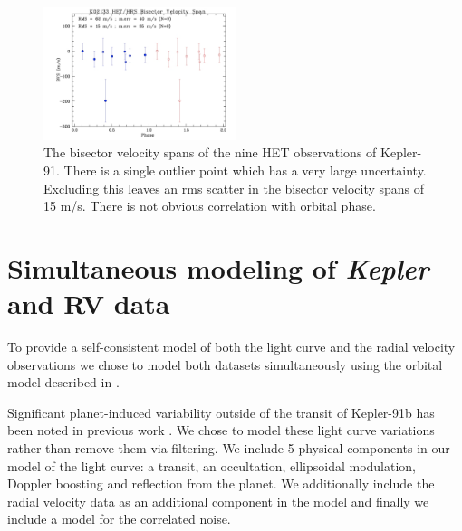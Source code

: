 \documentclass[apjl]{emulateapj}
\begin{document}

\begin{figure}
\includegraphics[width=0.50\textwidth]{k02133_bvs_phas1.pdf}
\caption{The bisector velocity spans of the nine HET observations of Kepler-91. There is a single outlier point which has a very large uncertainty. Excluding this leaves an rms scatter in the bisector velocity spans of 15 m/s. There is not obvious correlation with orbital phase.}
\label{fig:bisectors}
\end{figure}


\section{Simultaneous modeling of \emph{Kepler} and RV data}
To provide a self-consistent model of both the light curve and the radial velocity observations we chose to model both datasets simultaneously using the orbital model described in \citet{rowe14}.

Significant planet-induced variability outside of the transit of Kepler-91b has been noted in previous work \citep{lillo14,esteves13}. We chose to model these light curve variations rather than remove them via filtering.  We include 5 physical components in our model of the light curve: a transit, an occultation, ellipsoidal modulation, Doppler boosting and reflection from the planet. We additionally include the radial velocity data as an additional component in the model and finally we include a model for the correlated noise.
\end{document}
